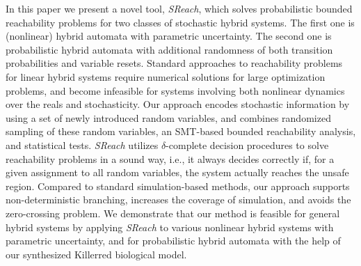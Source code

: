 In this paper we present a novel tool, {\it SReach}, which solves probabilistic bounded reachability problems for two classes of stochastic hybrid systems. The first one is (nonlinear) hybrid automata with parametric uncertainty. The second one is probabilistic hybrid automata with additional randomness of both transition probabilities and variable resets. Standard approaches to reachability problems for linear hybrid systems require numerical solutions for large optimization problems, and become infeasible for systems involving both nonlinear dynamics over the reals and stochasticity. Our approach encodes stochastic information by using a set of newly introduced random variables, and combines randomized sampling of these random variables, an SMT-based bounded reachability analysis, 
and statistical tests. {\it SReach} utilizes $\delta$-complete decision procedures 
to solve reachability problems in a sound way, i.e., it always decides correctly if, for a given
assignment to all random variables, the system actually reaches the unsafe region.
Compared to standard simulation-based methods, our approach supports 
non-deterministic branching, increases the coverage of simulation, and avoids the
zero-crossing problem. We demonstrate that our method is feasible for general
hybrid systems by applying {\it SReach} to
various nonlinear hybrid systems with parametric uncertainty, and for probabilistic hybrid automata with the help of our synthesized Killerred biological model.

